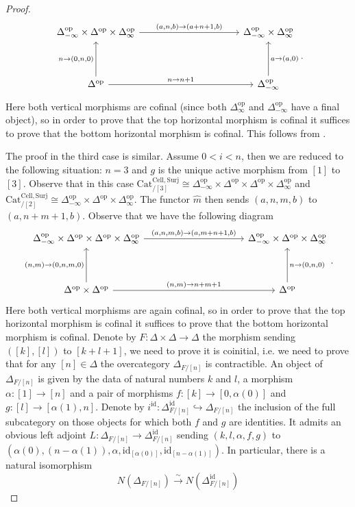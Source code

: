 \documentclass[a4paper, reqno]{amsart}
\theoremstyle{definition}
\newcommand\id{\mathrm{id}}
\newcommand\op{\mathrm{op}}
\begin{document}
\begin{proof}
\[
\begin{tikzcd}[row sep=huge, column sep=huge]
\Delta^\op_{-\infty}\times\Delta^\op\times \Delta^\op_\infty\arrow[rr,"{(a,n,b)}\rightarrow{(a+n+1,b)}"]&{}&\Delta^\op_{-\infty}\times \Delta^\op_\infty\\
\Delta^\op\arrow[u, "n\rightarrow{(0,n,0)}"]\arrow[rr,"{n\rightarrow n+1}"]&{}&\Delta^\op_{-\infty}\arrow[u, "a\rightarrow{(a,0)}" swap]
\end{tikzcd}.
\]
Here both vertical morphisms are cofinal (since both $\Delta^\op_\infty$ and $\Delta^\op_{-\infty}$ have a final object), so in order to prove that the top horizontal morphism is cofinal it suffices to prove that the bottom horizontal morphism is cofinal. This follows from \cite[Lemma 6.1.3.16.]{lurie2009higher}.\par
The proof in the third case is similar. Assume $0<i<n$, then we are reduced to the following situation: $n=3$ and $g$ is the unique active morphism from $[1]$ to $[3]$. Observe that in this case $\mathrm{Cat}^{\mathrm{Cell},\mathrm{Surj}}_{/[3]}\cong \Delta^\op_{-\infty}\times\Delta^\op\times\Delta^\op\times \Delta^\op_\infty$ and $\mathrm{Cat}^{\mathrm{Cell},\mathrm{Surj}}_{/[2]}\cong \Delta^\op_{-\infty}\times\Delta^\op\times \Delta^\op_\infty$. The functor $\widehat{m}$ then sends $(a,n,m,b)$ to $(a,n+m+1,b)$. Observe that we have the following diagram
\[
\begin{tikzcd}[row sep=huge, column sep=huge]
\Delta^\op_{-\infty}\times\Delta^\op\times\Delta^\op\times \Delta^\op_\infty\arrow[rr,"{(a,n,m,b)}\rightarrow{(a,m+n+1,b)}"]&{}&\Delta^\op_{-\infty}\times\Delta^\op\times \Delta^\op_\infty\\
\Delta^\op\times\Delta^\op\arrow[u, "{(n,m)}\rightarrow{(0,n,m,0)}"]\arrow[rr,"{{(n,m)}\rightarrow n+m+1}"]&{}&\Delta^\op\arrow[u, "n\rightarrow{(0,n,0)}" swap]
\end{tikzcd}.
\]
Here both vertical morphisms are again cofinal, so in order to prove that the top horizontal morphism is cofinal it suffices to prove that the bottom horizontal morphism is cofinal. Denote by $F:\Delta\times\Delta\rightarrow\Delta$ the morphism sending $([k],[l])$ to $[k+l+1]$, we need to prove it is coinitial, i.e. we need to prove that for any $[n]\in\Delta$ the overcategory $\Delta_{F/[n]}$ is contractible. An object of $\Delta_{F/[n]}$ is given by the data of natural numbers $k$ and $l$, a morphism $\alpha:[1]\rightarrow[n]$ and a pair of morphisms $f:[k]\rightarrow [0,\alpha(0)]$ and $g:[l]\rightarrow [\alpha(1),n]$. Denote by $i^\id:\Delta_{F/[n]}^\id\hookrightarrow\Delta_{F/[n]}$ the inclusion of the full subcategory on those objects for which both $f$ and $g$ are identities. It admits an obvious left adjoint $L:\Delta_{F/[n]}\rightarrow\Delta_{F/[n]}^\id$ sending $(k,l,\alpha,f,g)$ to $(\alpha(0),(n-\alpha(1)),\alpha,\id_{[\alpha(0)]},\id_{[n-\alpha(1)]})$. In particular, there is a natural isomorphism \[N(\Delta_{F/[n]})\xrightarrow{\sim}N(\Delta_{F/[n]}^\id)\]

\end{proof}
\end{document}
